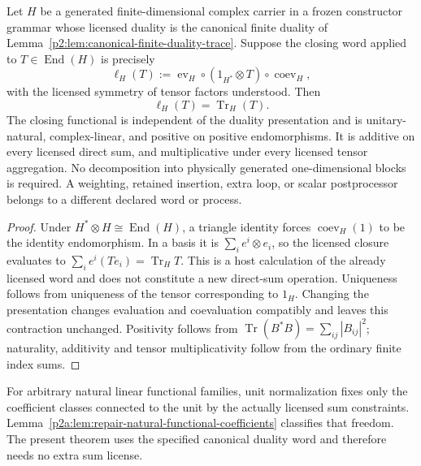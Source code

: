 \documentclass[12pt,a4paper]{article}
\begin{document}
\begin{theorem}
\label{p2:thm:unmarked-natural-closure}
Let $H$ be a generated finite-dimensional complex carrier in a frozen
constructor grammar whose licensed duality is the canonical finite duality of
Lemma~\ref{p2:lem:canonical-finite-duality-trace}. Suppose the closing word
applied to $T\in\operatorname{End}(H)$ is precisely
\[
 \ell_H(T):=
 \operatorname{ev}_H\circ(1_{H^*}\otimes T)\circ\operatorname{coev}_H,
\]
with the licensed symmetry of tensor factors understood. Then
\[
 \boxed{\ell_H(T)=\operatorname{Tr}_H(T).}
\]
The closing functional is independent of the duality presentation and is
unitary-natural, complex-linear, and positive on positive endomorphisms.
It is additive on every licensed direct sum, and multiplicative under every
licensed tensor aggregation. No decomposition into physically generated
one-dimensional blocks is required. A weighting, retained insertion, extra
loop, or scalar postprocessor belongs to a different declared word or process.
\end{theorem}
\begin{proof}
Under $H^*\otimes H\cong\operatorname{End}(H)$, a triangle identity forces
$\operatorname{coev}_H(1)$ to be the identity endomorphism. In a basis it is
$\sum_i e^i\otimes e_i$, so the licensed closure evaluates to
$\sum_i e^i(Te_i)=\operatorname{Tr}_H T$. This is a host calculation of the
already licensed word and does not constitute a new direct-sum operation.
Uniqueness follows from uniqueness of the tensor corresponding to $1_H$.
Changing the presentation changes evaluation and coevaluation compatibly and
leaves this contraction unchanged. Positivity follows from
$\operatorname{Tr}(B^*B)=\sum_{ij}|B_{ij}|^2$; naturality, additivity and
tensor multiplicativity follow from the ordinary finite index sums.
\end{proof}

For arbitrary natural linear functional families, unit normalization fixes
only the coefficient classes connected to the unit by the actually licensed
sum constraints. Lemma~\ref{p2a:lem:repair-natural-functional-coefficients}
classifies that freedom. The present theorem uses the specified canonical
duality word and therefore needs no extra sum license.
\end{document}
